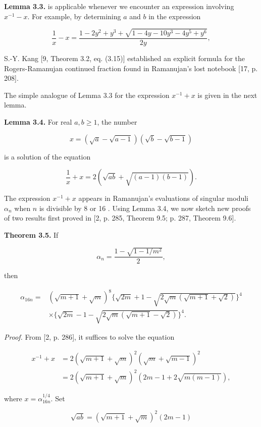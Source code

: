 \documentclass[11pt,letterpaper]{article}
\begin{document}
\noindent\textbf{Lemma 3.3.} is applicable whenever we encounter an expression involving $x^{-1}-x$. For example, by determining $a$ and $b$ in the expression

\[
\frac{1}{x}-x=\frac{1-2 y^{2}+y^{3}+\sqrt{1-4 y-10 y^{3}-4 y^{5}+y^{6}}}{2 y},
\]

S.-Y. Kang [9, Theorem 3.2, eq. (3.15)] established an explicit formula for the Rogers-Ramanujan continued fraction found in Ramanujan's lost notebook [17, p. 208].

The simple analogue of Lemma 3.3 for the expression $x^{-1}+x$ is given in the next lemma.

\noindent\textbf{Lemma 3.4.} For real $a,b\geq1$, the number

\[
x=(\sqrt{a}-\sqrt{a-1})(\sqrt{b}-\sqrt{b-1})
\]

is a solution of the equation


\begin{equation*}
\frac{1}{x}+x=2(\sqrt{a b}+\sqrt{(a-1)(b-1)}) . \tag{3.5}\label{eq:3.5}
\end{equation*}


The expression $x^{-1}+x$ appears in Ramanujan's evaluations of singular moduli $\alpha_{n}$ when $n$ is divisible by 8 or 16 . Using Lemma 3.4, we now sketch new proofs of two results first proved in [2, p. 285, Theorem 9.5; p. 287, Theorem 9.6].

\noindent\textbf{Theorem 3.5.} If

\[
\alpha_{n}=\frac{1-\sqrt{1-1 / m^{2}}}{2},
\]

then

\[
\begin{aligned}
\alpha_{16 n}= & (\sqrt{m+1}+\sqrt{m})^{8}\{\sqrt{2 m}+1-\sqrt{2 \sqrt{m}(\sqrt{m+1}+\sqrt{2})}\}^{4} \\
& \times\{\sqrt{2 m}-1-\sqrt{2 \sqrt{m}(\sqrt{m+1}-\sqrt{2})}\}^{4} .
\end{aligned}
\]

\noindent\textit{Proof.} From [2, p. 286], it suffices to solve the equation

\[
\begin{aligned}
x^{-1}+x & =2(\sqrt{m+1}+\sqrt{m})^{2}(\sqrt{m}+\sqrt{m-1})^{2} \\
& =2(\sqrt{m+1}+\sqrt{m})^{2}(2 m-1+2 \sqrt{m(m-1)}),
\end{aligned}
\]

where $x=\alpha_{16 n}^{1 / 4}$. Set


\begin{equation*}
\sqrt{a b}=(\sqrt{m+1}+\sqrt{m})^{2}(2 m-1) \tag{3.6}\label{eq:3.6}
\end{equation*}
\end{document}
